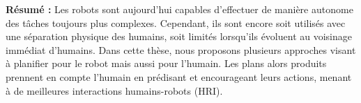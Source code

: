\documentclass[english,a4paper,11pt,twoside]{StyleThese}
\begin{document}
\begin{vcenterpage}
\begin{comment}
In this thesis we show why it is crucial for a robot not only to plan for itself but also for the nearby human in order to predict, elicit and guide human decisions and actions. 
First, we prove, through a user study, planning both for the robot and the human trajectories is important to make a successful and efficient crossing with a human in a narrow corridor. The resulting robot trajectory are not only more acceptable to the human but also allows for the robot to communicate about the proposed collaborative plan.
Secondly, we alleviate from inherent complexity and ephemeral nature of collaborative motion planning to propose a method for planning communication in human robot task planning. An novel approach for referring expression generation is described and shown to be the most computationally efficient method to date while being designed for human robot interaction scenarios. This algorithm is then integrated in a human robot task planner: the Hierarchical Agent-base Task Planner (HATP), enabling for the estimation of the feasibility and the cost of communication actions by resolving their content during task planning. 
Finally, we introduce a new task planning scheme reasoning on separate human and robot beliefs and action domains. By exploring two HTNs corresponding respectively to the planning domain of the robot and the task model of the human, the planner is able to predict and elicit human actions by emulating their decision and reaction processes. The pertinence of the scheme is showed on example and a more complete challenging task is presented: the director task.
\end{comment}

\textbf{Résumé :}
Les robots sont aujourd'hui capables d'effectuer de manière autonome des tâches toujours plus complexes. Cependant, ils sont encore soit utilisés avec une séparation physique des humains, soit limités lorsqu'ils évoluent au voisinage immédiat d'humains. Dans cette thèse, nous proposons plusieurs approches visant à planifier pour le robot mais aussi pour l'humain. Les plans alors produits prennent en compte l'humain en prédisant et encourageant leurs actions, menant à de meilleures interactions humains-robots (HRI).


\end{vcenterpage}
\end{document}
